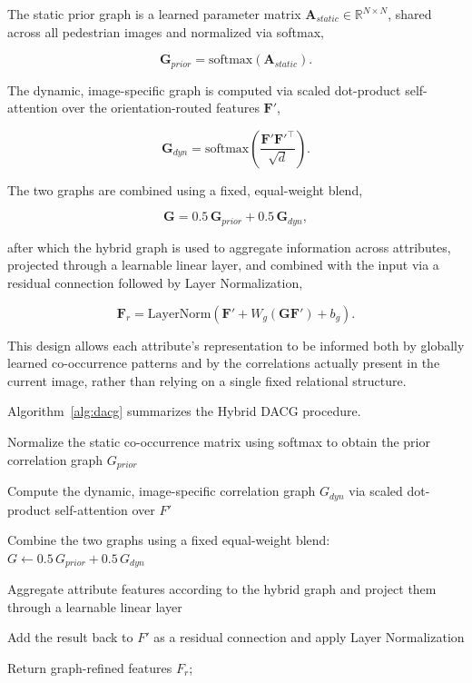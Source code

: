 \documentclass{ieeeaccess}
\begin{document}
The static prior graph is a learned parameter matrix $\mathbf{A}_{static}\in\mathbb{R}^{N\times N}$, shared across all pedestrian images and normalized via softmax,

\begin{equation}
\mathbf{G}_{prior}=\mathrm{softmax}(\mathbf{A}_{static}).
\label{eq:g_prior}
\end{equation}

The dynamic, image-specific graph is computed via scaled dot-product self-attention over the orientation-routed features $\mathbf{F}'$,

\begin{equation}
\mathbf{G}_{dyn}=\mathrm{softmax}\!\left(\frac{\mathbf{F}'\mathbf{F}'^{\top}}{\sqrt{d}}\right).
\label{eq:g_dyn}
\end{equation}

The two graphs are combined using a fixed, equal-weight blend,

\begin{equation}
\mathbf{G}=0.5\,\mathbf{G}_{prior}+0.5\,\mathbf{G}_{dyn},
\label{eq:g_hybrid}
\end{equation}

after which the hybrid graph is used to aggregate information across attributes, projected through a learnable linear layer, and combined with the input via a residual connection followed by Layer Normalization,

\begin{equation}
\mathbf{F}_{r}=\mathrm{LayerNorm}\!\left(\mathbf{F}'+W_{g}(\mathbf{G}\mathbf{F}')+b_{g}\right).
\label{eq:dacg_output}
\end{equation}

This design allows each attribute's representation to be informed both by globally learned co-occurrence patterns and by the correlations actually present in the current image, rather than relying on a single fixed relational structure.

Algorithm~\ref{alg:dacg} summarizes the Hybrid DACG procedure.
\begin{algorithm}[H]
\caption{Hybrid Dynamic Attribute Correlation Graph (Hybrid DACG)}
\label{alg:dacg}

Normalize the static co-occurrence matrix using softmax to obtain the prior correlation graph $G_{prior}$\;

Compute the dynamic, image-specific correlation graph $G_{dyn}$ via scaled dot-product self-attention over $F'$\;

Combine the two graphs using a fixed equal-weight blend: $G \leftarrow 0.5\,G_{prior}+0.5\,G_{dyn}$\;

Aggregate attribute features according to the hybrid graph and project them through a learnable linear layer\;

Add the result back to $F'$ as a residual connection and apply Layer Normalization\;

Return graph-refined features $F_r$;

\end{algorithm}
\end{document}

